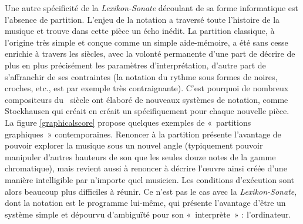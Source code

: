 \documentclass[a4paper,12pt]{article}
\newcommand{\guill}[1]{«~#1~»}
\begin{document}
Une autre spécificité de la \emph{Lexikon-Sonate} découlant de sa forme informatique est l'absence de partition. L'enjeu de la notation a traversé toute l'histoire de la musique et trouve dans cette pièce un écho inédit. La partition classique, à l'origine très simple et conçue comme un simple aide-mémoire, a été sans cesse enrichie à travers les siècles, avec la volonté permanente d'une part de décrire de plus en plus précisément les paramètres d'interprétation, d'autre part de s'affranchir de ses contraintes (la notation du rythme sous formes de noires, croches, etc., est par exemple très contraignante). C'est pourquoi de nombreux compositeurs du \XXe~siècle ont élaboré de nouveaux systèmes de notation, comme Stockhausen qui créait en créait un spécifiquement pour chaque nouvelle pièce. La figure \ref{graphicalscore} propose quelques exemples de \guill{partitions graphiques} contemporaines.
Renoncer à la partition présente l'avantage de pouvoir explorer la musique sous un nouvel angle (typiquement pouvoir manipuler d'autres hauteurs de son que les seules douze notes de la gamme chromatique), mais revient aussi à renoncer à décrire l'œuvre ainsi créée d'une manière intelligible par n'importe quel musicien. Les conditions d'exécution sont alors beaucoup plus difficiles à réunir. Ce n'est pas le cas avec la \emph{Lexikon-Sonate}, dont la notation est le programme lui-même, qui présente l'avantage d'être un système simple et dépourvu d'ambiguïté pour son \guill{interprète} : l'ordinateur.
\end{document}
